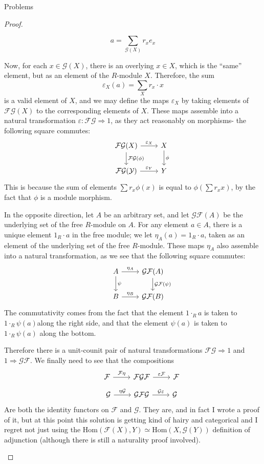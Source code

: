 \documentclass[12pt]{article}
\theoremstyle{definition}
\begin{document}
\begin{section}{Problems}
\begin{proof}
\begin{enumerate}[label=(\alph*)]
		\[a = \sum_{\mathcal{G}(X)} r_x e_x\]
		\par Now, for each $x \in \mathcal{G}(X)$, there is an overlying $x \in X$, which is the ``same'' element, but as an element of the $R$-module $X$. Therefore, the sum 
		\[\varepsilon_X(a) = \sum_{X}r_x \cdot x\]
		is a valid element of $X$, and we may define the maps $\varepsilon_X$ by taking elements of $\mathcal{FG}(X)$ to the corresponding elements of $X$. These maps assemble into a natural transformation $\varepsilon : \mathcal{FG} \Rightarrow 1$, as they act reasonably on morphisms- the following square commutes:
		\[ \begin{tikzcd}&\mathcal{FG}(X) \arrow[r, "\varepsilon_X"] \arrow[d, "\mathcal{FG}(\phi)"] & X \arrow[d, "\phi"]\\&\mathcal{FG(Y)} \arrow[r, "\varepsilon_Y"] & Y\end{tikzcd}\]
		This is because the sum of elements $\sum r_x \phi(x)$ is equal to $\phi\left( \sum r_x x \right)$, by the fact that $\phi$ is a module morphism.
		\par In the opposite direction, let $A$ be an arbitrary set, and let $\mathcal{GF}(A)$ be the underlying set of the free $R$-module on $A$. For any element $a \in A$, there is a unique element $1_R \cdot a$ in the free module; we let $\eta_A(a) = 1_R \cdot a$, taken as an element of the underlying set of the free $R$-module. These maps $\eta_A$ also assemble into a natural transformation, as we see that the following square commutes:
		\[ \begin{tikzcd}&A \arrow[r, "\eta_A"] \arrow[d, "\psi"] & \mathcal{GF}(A) \arrow[d, "\mathcal{GF}(\psi)"]\\& B \arrow[r, "\eta_B"] & \mathcal{GF}(B)\end{tikzcd}\]
		The commutativity comes from the fact that the element $1 \cdot_R a$ is taken to $1 \cdot_R \psi(a)$along the right side, and that the element $\psi(a)$ is taken to $1 \cdot_R \psi(a)$ along the bottom. 
		\par Therefore there is a unit-counit pair of natural transformations $\mathcal{FG} \Rightarrow 1$ and $1 \Rightarrow \mathcal{GF}$. We finally need to see that the compositions 
	\[		
		\begin{tikzcd}
				&\mathcal{F} \arrow[r, "\mathcal{F}\eta"] &\mathcal{FGF} \arrow[r, "\varepsilon\mathcal{F}"] &\mathcal{F}
	\end{tikzcd}
\]
\[ \begin{tikzcd}
				&\mathcal{G} \arrow[r, "\eta\mathcal{G}"] &\mathcal{GFG} \arrow[r, "\mathcal{G}\varepsilon"] &\mathcal{G}
		\end{tikzcd}\]
		Are both the identity functors on $\mathcal{F}$ and $\mathcal{G}$. They are, and in fact I wrote a proof of it, but at this point this solution is getting kind of hairy and categorical and I regret not just using the $\text{Hom}(\mathcal{F}(X), Y) \simeq \text{Hom}(X, \mathcal{G}(Y))$ definition of adjunction (although there is still a naturality proof involved).
	\end{enumerate}
\end{proof}
\end{section}
\end{document}
